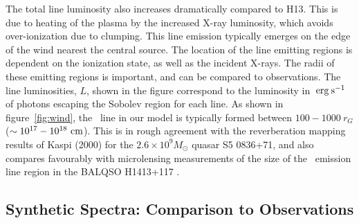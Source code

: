 \documentclass[useAMS,usenatbib]{mn2e_x}
\begin{document}
The total line luminosity also increases dramatically compared to H13. 
This is due to heating of the plasma by the increased X-ray 
luminosity, which avoids over-ionization due to clumping.
This line emission typically emerges on the edge of the wind
nearest the central source. The location of the line emitting regions
is dependent on the ionization state, as well as the incident X-rays.
The radii of these emitting regions is important,
and can be compared to observations. The line luminosities, $L$,
shown in the figure correspond to the luminosity in $\:{\rm erg\:s^{-1}}$ of photons
escaping the Sobolev region for each line. 
As shown in figure~\ref{fig:wind},
the \civ\ line in our model is typically formed between 
$100-1000~r_G$ ($\sim10^{17}-10^{18}~\rm{cm}$).
This is in rough agreement with the reverberation mapping 
results of Kaspi (2000) for the $2.6\times10^{9} M_\odot$ quasar S5 0836+71,
and also compares favourably with microlensing measurements of the size of the
\civ\ emission line region in the BALQSO H1413+117 \citep{odowd2015}.


\subsection{Synthetic Spectra: Comparison to Observations}
\end{document}
